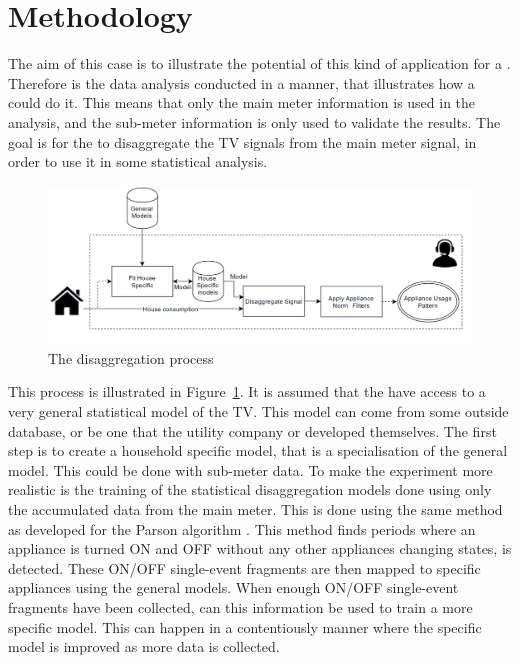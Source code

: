 \section{Methodology}
The aim of this case is to illustrate the potential of this kind of application for a . Therefore is the data analysis conducted in a manner, that illustrates how a  could do it. This means that only the main meter information is used in the analysis, and the sub-meter information is only used to validate the results.  The goal is for the  to disaggregate the TV signals from the main meter signal, in order to use it in some statistical analysis. 

\begin{figure}[H]
\centering
\includegraphics[width=1\textwidth]{billeder/Electric company method.png}
\caption{The disaggregation process}
\label{fig:ECM}
\end{figure}

This process is illustrated in Figure~\ref{fig:ECM}. It is assumed that the  have access to a very general statistical model of the TV. This model can come from some outside database, or be one that the utility company or  developed themselves. The first step is to create a household specific model, that is a specialisation of the general model. This could be done with sub-meter data. To make the experiment more realistic is the training of the statistical disaggregation models done using only the accumulated data from the main meter. This is done using the same method as developed for the Parson algorithm \citep{RefWorks:28}. This method finds periods where an appliance is turned ON and OFF without any other appliances changing states, is detected. These ON/OFF single-event fragments are then mapped to specific appliances using the general models. When enough ON/OFF single-event fragments have been collected, can this information be used to train a more specific model. This can happen in a contentiously manner where the specific model is improved as more data is collected.  

